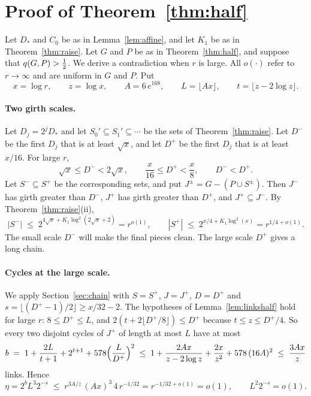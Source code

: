 \section{Proof of Theorem~\ref{thm:half}}\label{sec:halfproof}

Let $D_{*}$ and $C_0$ be as in Lemma~\ref{lem:affine}, and let $K_1$ be as in
Theorem~\ref{thm:raise}. Let $G$ and $P$ be as in Theorem~\ref{thm:half}, and suppose that
$q(G,P)>\tfrac12$. We derive a contradiction when $r$ is large. All $o(\cdot)$ refer to $r\to\infty$ and
are uniform in $G$ and $P$. Put
\[
  x=\log r,\qquad z=\log x,\qquad A=6\,e^{168},\qquad L=\lfloor Ax\rfloor,\qquad
  t=\lfloor z-2\log z\rfloor .
\]

\paragraph{Two girth scales.}
Let $D_j=2^{j}D_{*}$ and let $S_0'\subseteq S_1'\subseteq\cdots$ be the sets of
Theorem~\ref{thm:raise}. Let $D^{-}$ be the first $D_j$ that is at least $\sqrt x$, and let $D^{+}$
be the first $D_j$ that is at least $x/16$. For large $r$,
\[
  \sqrt x\le D^{-}<2\sqrt x,\qquad \frac x{16}\le D^{+}<\frac x8,\qquad D^{-}<D^{+}.
\]
Let $S^{-}\subseteq S^{+}$ be the corresponding sets, and put $J^{\pm}=G-(P\cup S^{\pm})$. Then
$J^{-}$ has girth greater than $D^{-}$, $J^{+}$ has girth greater than $D^{+}$, and
$J^{+}\subseteq J^{-}$. By Theorem~\ref{thm:raise}(ii),
\begin{equation}\label{eq:twosizes}
  |S^{-}|\;\le\;2^{4\sqrt x+K_1\log^{2}(2\sqrt x+2)}=r^{o(1)},\qquad
  |S^{+}|\;\le\;2^{x/4+K_1\log^{2}(x)}=r^{1/4+o(1)}.
\end{equation}
The small scale $D^{-}$ will make the final pieces clean. The large scale $D^{+}$ gives a long chain.

\paragraph{Cycles at the large scale.}
We apply Section~\ref{sec:chain} with $S=S^{+}$, $J=J^{+}$, $D=D^{+}$ and
$s=\lfloor(D^{+}-1)/2\rfloor\ge x/32-2$. The hypotheses of Lemma~\ref{lem:linkshalf} hold for large
$r$: $8\le D^{+}\le L$, and $2(t+2\lfloor D^{+}/8\rfloor)\le D^{+}$ because $t\le z\le D^{+}/4$. So
every two disjoint cycles of $J^{+}$ of length at most $L$ have at most
\[
  b\;=\;1+\frac{2L}{t+1}+2^{t+1}+578\Bigl(\frac L{D^{+}}\Bigr)^{2}
  \;\le\;1+\frac{2Ax}{z-2\log z}+\frac{2x}{z^{2}}+578\,(16A)^{2}\;\le\;\frac{3Ax}{z}
\]
links. Hence
\[
  \eta=2^{b}L^{3}2^{-s}\;\le\;r^{3A/z}\,(Ax)^{3}\,4\,r^{-1/32}=r^{-1/32+o(1)}=o(1),
  \qquad L^{2}2^{-s}=o(1).
\]

